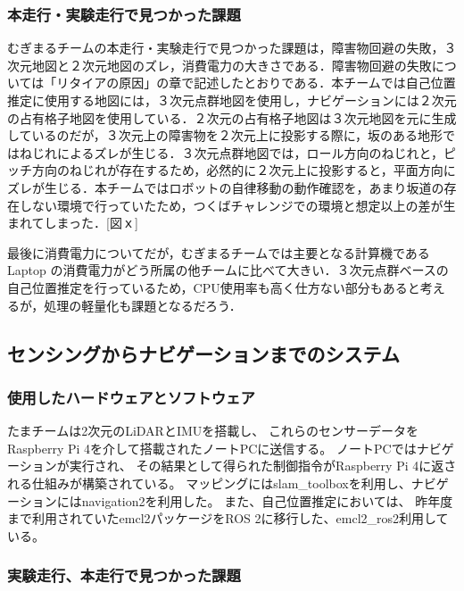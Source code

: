 \documentclass[twocolumn,9pt]{jsproceedings}
\begin{document}
\subsubsection{本走行・実験走行で見つかった課題}

むぎまるチームの本走行・実験走行で見つかった課題は，障害物回避の失敗，３次元地図と２次元地図のズレ，消費電力の大きさである．障害物回避の失敗については「リタイアの原因」の章で記述したとおりである．本チームでは自己位置推定に使用する地図には，３次元点群地図を使用し，ナビゲーションには２次元の占有格子地図を使用している．２次元の占有格子地図は３次元地図を元に生成しているのだが，３次元上の障害物を２次元上に投影する際に，坂のある地形ではねじれによるズレが生じる．３次元点群地図では，ロール方向のねじれと，ピッチ方向のねじれが存在するため，必然的に２次元上に投影すると，平面方向にズレが生じる．本チームではロボットの自律移動の動作確認を，あまり坂道の存在しない環境で行っていたため，つくばチャレンジでの環境と想定以上の差が生まれてしまった．[図ｘ] 

最後に消費電力についてだが，むぎまるチームでは主要となる計算機である Laptop の消費電力がどう所属の他チームに比べて大きい．３次元点群ベースの自己位置推定を行っているため，CPU使用率も高く仕方ない部分もあると考えるが，処理の軽量化も課題となるだろう．


\subsection{センシングからナビゲーションまでのシステム}\label{sub:localization}

\subsubsection{使用したハードウェアとソフトウェア}

たまチームは2次元のLiDARとIMUを搭載し、
これらのセンサーデータをRaspberry Pi 4を介して搭載されたノートPCに送信する。
ノートPCではナビゲーションが実行され、
その結果として得られた制御指令がRaspberry Pi 4に返される仕組みが構築されている。
マッピングにはslam\_toolboxを利用し、ナビゲーションにはnavigation2を利用した。
また、自己位置推定においては、
昨年度まで利用されていたemcl2パッケージをROS 2に移行した、emcl2\_ros2利用している。

\subsubsection{実験走行、本走行で見つかった課題}
\end{document}
